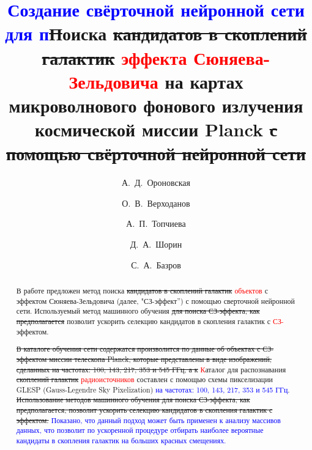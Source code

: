 \documentclass[
aps,%
12pt,%
final,%
notitlepage,%
oneside,%
onecolumn,%
nobibnotes,%
nofootinbib,%
superscriptaddress,%
noshowpacs,%
centertags]%
{revtex4}
\begin{document}

\title{\textcolor{blue}{Создание свёрточной нейронной сети для п}\sout{П}оиска \sout{кандидатов в скоплений галактик} \textcolor{red}{эффекта Сюняева-Зельдовича} на картах микроволнового фонового излучения космической миссии Planck\sout{ с помощью свёрточной нейронной сети}}


\author{А.~Д.~Ороновская}

\author{О.~В.~Верходанов}

\author{А.~П.~Топчиева}

\author{Д.~А.~Шорин}

\author{С.~А.~Базров}


\begin{abstract}
В работе предложен метод поиска \sout{кандидатов в скоплений галактик} \textcolor{red}{объектов} с эффектом Сюняева-Зельдовича (далее, "СЗ-эффект'') с помощью сверточной нейронной сети. Используемый метод машинного обучения \sout{для поиска СЗ-эффекта, как предполагается} позволит ускорить селекцию кандидатов в скопления галактик с \textcolor{red}{СЗ-}эффектом.

\sout{В каталоге обучения сети содержатся произволится по данные об объектах с СЗ-эффектом миссии телескопа Planck, которые представлены в виде изображений, сделанных на частотах: 100, 143, 217, 353 и 545 ГГц, а к} \textcolor{red}{К}аталог для распознавания \sout{скоплений галактик} \textcolor{red}{радиоисточников} составлен с помощью схемы пикселизации GLESP (Gauss-Legendre Sky Pixelization) \textcolor{blue}{на частотах: 100, 143, 217, 353 и 545 ГГц}. \sout{Использование методов машинного обучения для поиска СЗ-эффекта, как предполагается, позволит ускорить селекцию кандидатов в скопления галактик с эффектом.} \textcolor{blue}{Показано, что данный подход может быть применен к анализу массивов данных, что позволит по ускоренной процедуре отбирать наиболее вероятные кандидаты в скопления галактик на больших красных смещениях.}
\end{abstract}

\maketitle
\end{document}
